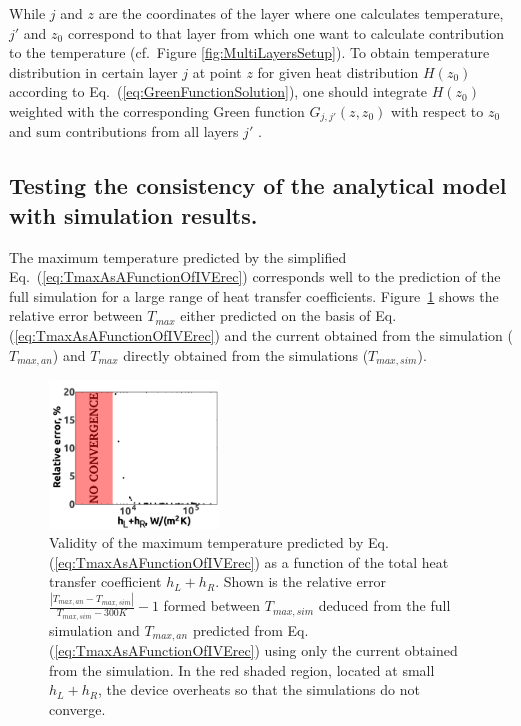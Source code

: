 \documentclass[%
9pt,
 aip,
rsi,%
 amsmath,amssymb,
preprint,%
]{revtex4-1}
\begin{document}
While $j$ and $z$ are the coordinates of the layer where one calculates temperature, $j'$ and $z_0$ correspond to that layer from which one want to calculate contribution to the temperature (cf.~Figure \ref{fig:MultiLayersSetup}). 
To obtain temperature distribution in certain layer $j$ at point $z$ for given heat distribution $H(z_0)$ according to Eq.~(\ref{eq:GreenFunctionSolution}), one should integrate $H(z_0)$ weighted with the corresponding Green function $G_{j,j'}(z,z_0)$ with respect to $z_0$ and sum contributions from all layers $j'$ . 

\subsection*{Testing the consistency of the analytical model with simulation results.}

The maximum temperature predicted by the simplified Eq.~(\ref{eq:TmaxAsAFunctionOfIVErec}) corresponds well to the prediction of the full simulation for a large range of heat transfer coefficients.
Figure~\ref{fig:connection_to_experiment} shows the relative error between $T_{max}$ either predicted on the basis of Eq.(\ref{eq:TmaxAsAFunctionOfIVErec}) and the current obtained from the simulation ($T_{max,an}$) and $T_{max}$ directly obtained from the simulations ($T_{max,sim}$).

\begin{figure}[h]
	\centering
    \includegraphics[width=0.4\textwidth]{General_plots_2.pdf}
    \caption{Validity of the maximum temperature predicted by Eq.(\ref{eq:TmaxAsAFunctionOfIVErec}) as a function of the total heat transfer coefficient $h_L + h_R$. Shown is the relative error $\frac{|T_{max,an} - T_{max,sim}| }{T_{max,sim}-300K} - 1$ formed between $T_{max,sim}$ deduced from the full simulation and $T_{max,an}$ predicted from Eq.(\ref{eq:TmaxAsAFunctionOfIVErec}) using only the current obtained from the simulation. In the red shaded region, located at small $h_L + h_R$, the device overheats so that the simulations do not converge.}
    \label{fig:connection_to_experiment}
\end{figure}
\end{document}
